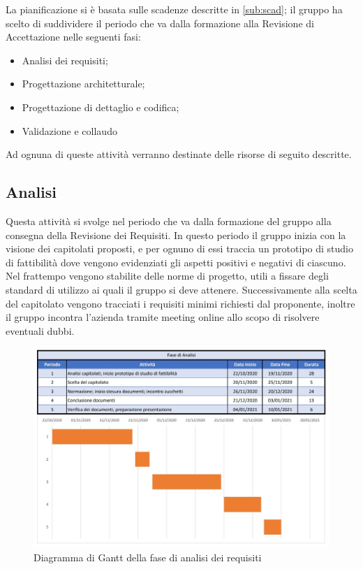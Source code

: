 \documentclass[../piano_di_progetto.tex]{subfiles}
\begin{document}
La pianificazione si è basata sulle scadenze descritte in \ref{sub:scad}; il gruppo ha scelto di suddividere il periodo che va dalla formazione alla Revisione di Accettazione nelle seguenti fasi:
\begin{itemize}
\item Analisi dei requisiti;
\item Progettazione architetturale;
\item Progettazione di dettaglio e codifica;
\item Validazione e collaudo
\end{itemize}
Ad ognuna di queste attività verranno destinate delle risorse di seguito descritte.


\subsection{Analisi}%
\label{sub:analisi}
Questa attività si svolge nel periodo che va dalla formazione del gruppo alla consegna della Revisione dei Requisiti. In questo periodo il gruppo inizia con la visione dei capitolati proposti, e per ognuno di essi traccia un prototipo di studio di fattibilità dove vengono evidenziati gli aspetti positivi e negativi di ciascuno. Nel frattempo vengono stabilite delle norme di progetto, utili a fissare degli standard di utilizzo ai quali il gruppo si deve attenere. Successivamente alla scelta del capitolato vengono tracciati i requisiti minimi richiesti dal proponente, inoltre il gruppo incontra l’azienda tramite meeting online allo scopo di risolvere eventuali dubbi. 

\begin{figure}[H]
\centering
\includegraphics[width=12cm]{fase_analisi}
\caption{Diagramma di Gantt della fase di analisi dei requisiti}
\end{figure}
\end{document}
